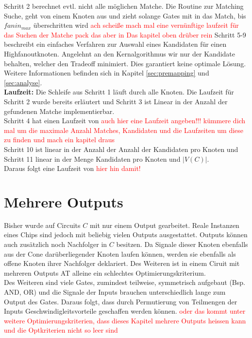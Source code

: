 \documentclass[11pt, a4paper, german]{article}
\begin{document}
Schritt 2 berechnet evtl. nicht alle möglichen Matche. Die Routine zur Matching Suche, geht von einem Knoten aus und zieht solange Gates mit in das Match, bis $fanin_{max}$ überschritten wird \textcolor{red}{ach scheiße mach mal eine vernünftige laufzeit für das Suchen der Matche pack das aber in Das kapitel oben drüber rein}
Schritt 5-9 beschreibt ein einfaches Verfahren zur Auswahl eines Kandidaten für einen Highfanoutknoten. Angelehnt an den Kernalgorithmus wir nur der Kandidate behalten, welcher den Tradeoff minimiert. Dies garantiert keine optimale Lösung. Weitere Informationen befinden sich in Kapitel \ref{sec:premapping} und \ref{sec:analyse}. \\
{\bf Laufzeit: } Die Schleife aus Schritt 1 läuft durch alle Knoten. Die Laufzeit für Schritt 2 wurde bereits erläutert und Schritt 3 ist Linear in der Anzahl der gefundenen Matche implementierbar. \\
Schritt 4 hat einen Laufzeit von \textcolor{red}{auch hier eine Laufzeit angeben!!! kümmere dich mal um die maximale Anzahl Matches, Kandidaten und die Laufzeiten um diese zu finden und mach ein kapitel draus }\\
Schritt 10 ist linear in der Anzahl der Anzahl der Kandidaten pro Knoten und Schritt 11 linear in der Menge Kandidaten pro Knoten und $|V(C)|$.\\
Daraus folgt eine Laufzeit von \textcolor{red}{hier hin damit!}



\section{Mehrere Outputs}
Bisher wurde auf Circuits $C$ mit nur einem Output gearbeitet. Reale Instanzen eines Chips sind jedoch mit beliebig vielen Outputs ausgestattet. Outputs können auch zusätzlich noch Nachfolger in $C$ besitzen. Da Signale dieser Knoten ebenfalls aus der Cone darüberliegender Knoten laufen können, werden sie ebenfalls als offene Knoten ihrer Nachfolger deklariert. Des Weiteren ist in einem Ciruit mit mehreren Outputs AT alleine ein schlechtes Optimierungskriterium. \\
Des Weiteren sind viele Gates, zumindest teilweise, symmetrisch aufgebaut (Bsp. AND, OR) und die Signale der Inputs brauchen unterschiedlich lange zum Output des Gates. Daraus folgt, dass durch Permutierung von Teilmengen der Inputs Geschwindigleitsvorteile geschaffen werden können. 
\textcolor{red}{oder das kommt unter weitere Optimierungskriterien, dass dieses Kapitel mehrere Outputs heissen kann und die Optkriterien nicht so leer sind}
\end{document}
